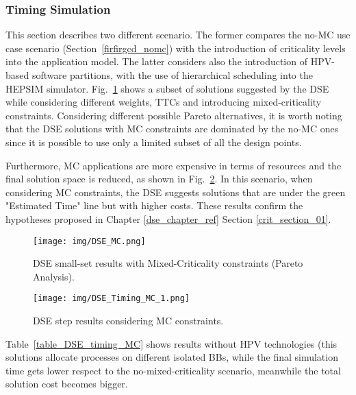 \subsubsection{Timing Simulation}
%
This section describes two different scenario. The former compares the no-MC use case scenario (Section~\ref{firfirgcd_nomc}) with the introduction of criticality levels into the application model. The latter considers also the introduction of HPV-based software partitions, with the use of hierarchical scheduling into the HEPSIM simulator.
%
%
Fig.~\ref{dse_small_01_MC} shows a subset of solutions suggested by the DSE while considering different weights, TTCs and introducing mixed-criticality constraints. Considering different possible Pareto alternatives, it is worth noting that the DSE solutions with MC constraints are dominated by the no-MC ones since it is possible to use only a limited subset of all the design points. \par
Furthermore, MC applications are more expensive in terms of resources and the final solution space is reduced, as shown in Fig.~\ref{dse_small_02_MC}. In this scenario, when considering MC constraints, the DSE suggests solutions that are under the green "Estimated Time" line but with higher costs. These results confirm the hypotheses proposed in Chapter \ref{dse_chapter_ref} Section \ref{crit_section_01}. \par
%
\begin{figure}[htbp]
	\centerline{\texttt{[image: img/DSE\_MC.png]}}
	\caption{DSE small-set results with Mixed-Criticality constraints (Pareto Analysis).}
	\label{dse_small_01_MC}
\end{figure}
%
%
\begin{figure}[htbp]
	\centerline{\texttt{[image: img/DSE\_Timing\_MC\_1.png]}}
	\caption{DSE step results considering MC constraints.}
	\label{dse_small_02_MC}
\end{figure}
%
Table~\ref{table_DSE_timing_MC} shows results without HPV technologies (this solutions allocate processes on different isolated BBs, while the final simulation time gets lower respect to the no-mixed-criticality scenario, meanwhile the total solution cost becomes bigger.
%
